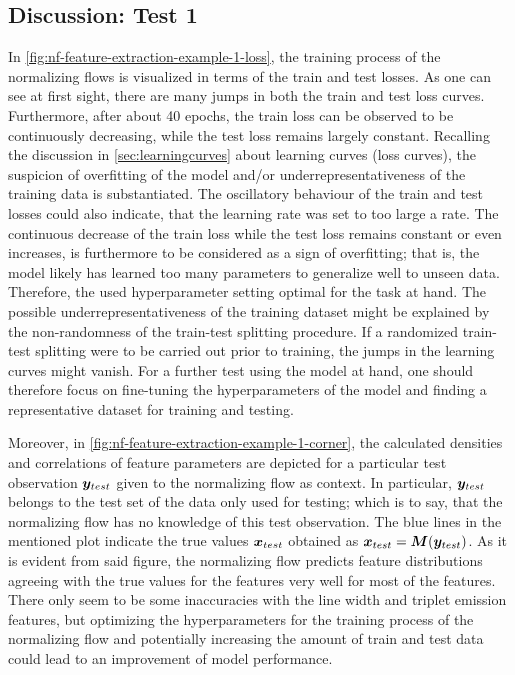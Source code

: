 \documentclass[a4paper,12pt]{report}
\def\lk#1{{\color{black}{#1}}}
\begin{document}
\subsection{Discussion: Test 1}\label{sec:feature-extraction-test-1}
In \cref{fig:nf-feature-extraction-example-1-loss}, the training process of the normalizing flows is visualized in terms of the train and test losses. As one can see at first sight, there are many jumps in both the train and test loss curves. Furthermore, after about 40 epochs, the train loss can be observed to be continuously decreasing, while the test loss remains largely constant. Recalling the discussion in \cref{sec:learningcurves} about learning curves (loss curves), the suspicion of overfitting of the model and/or underrepresentativeness of the training data is substantiated. The oscillatory behaviour of the train and test losses could also indicate, that the learning rate was set to too large a rate. The continuous decrease of the train loss while the test loss remains constant or even increases, is furthermore to be considered as a sign of overfitting; that is, the model likely has learned too many parameters to generalize well to unseen data. Therefore, the used hyperparameter setting \lk{very likely not} optimal for the task at hand. The possible underrepresentativeness of the training dataset might be explained by the non-randomness of the train-test splitting procedure. If a randomized train-test splitting were to be carried out prior to training, the jumps in the learning curves might vanish. For a further test using the model at hand, one should therefore focus on fine-tuning the hyperparameters of the model and finding a representative dataset for training and testing.

Moreover, in \cref{fig:nf-feature-extraction-example-1-corner}, the calculated densities and correlations of feature parameters are depicted for a particular test observation $\bm{y}_{test}$ given to the normalizing flow as context. In particular, $\bm{y}_{test}$ belongs to the test set of the data only used for testing; which is to say, that the normalizing flow has no knowledge of this test observation. The blue lines in the mentioned plot indicate the true values $\bm{x}_{test}$ obtained as $\bm{x}_{test} = \bm{M}(\bm{y}_{test})$. As it is evident from said figure, the normalizing flow predicts feature distributions agreeing with the true values for the features very well for most of the features. There only seem to be some inaccuracies with the line width and triplet emission features, but optimizing the hyperparameters for the training process of the normalizing flow and potentially increasing the amount of train and test data could lead to an improvement of model performance.
\end{document}
